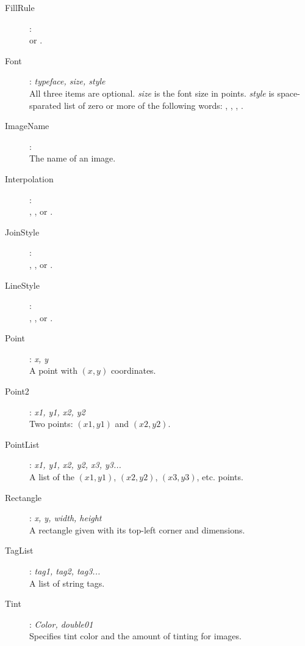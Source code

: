 \begin{description}
\item[FillRule]: \\
 or .

\item[Font]: \textit{typeface, size, style} \\
All three items are optional. \textit{size} is the font size in points.
\textit{style} is space-sparated list of zero or more of the following
words: , , , .

\item[ImageName]: \\
The name of an image.

\item[Interpolation]: \\
, , or .

\item[JoinStyle]: \\
, , or .

\item[LineStyle]: \\
, , or .

\item[Point]: \textit{x, y} \\
A point with $(x,y)$ coordinates.

\item[Point2]: \textit{x1, y1, x2, y2} \\
Two points: $(x1,y1)$ and $(x2,y2)$.

\item[PointList]: \textit{x1, y1, x2, y2, x3, y3...} \\
A list of the $(x1,y1)$, $(x2,y2)$, $(x3,y3)$, etc. points.

\item[Rectangle]: \textit{x, y, width, height} \\
A rectangle given with its top-left corner and dimensions.

\item[TagList]: \textit{tag1, tag2, tag3...} \\
A list of string tags.

\item[Tint]: \textit{Color, double01} \\
Specifies tint color and the amount of tinting for images.


\end{description}
